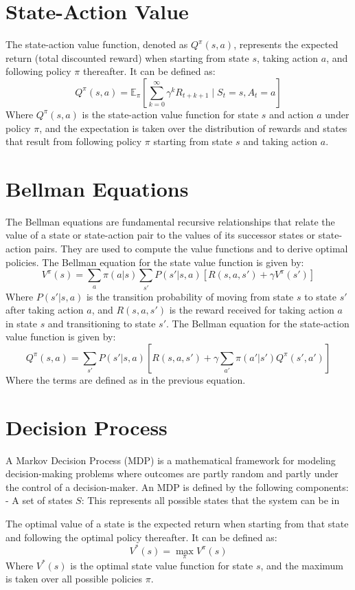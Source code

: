 \documentclass[conference]{IEEEtran}
\begin{document}
\section*{State-Action Value}
The state-action value function, denoted as $Q^{\pi}(s,a)$, represents the expected return (total discounted reward) when starting from state $s$, taking action $a$, and following policy $\pi$ thereafter. It can be defined as:
$$ Q^{\pi}(s,a) = \mathbb{E}_{\pi} \left[ \sum_{k=0}^{\infty} \gamma^k R_{t+k+1} \mid S_t = s, A_t = a \right] $$
Where $Q^{\pi}(s,a)$ is the state-action value function for state $s$ and action $a$ under policy $\pi$, and the expectation is taken over the distribution of rewards and states that result from following policy $\pi$ starting from state $s$ and taking action $a$.

\section*{Bellman Equations}
The Bellman equations are fundamental recursive relationships that relate the value of a state or state-action pair
to the values of its successor states or state-action pairs. They are used to compute the value functions and to derive optimal policies.
The Bellman equation for the state value function is given by:
$$ V^{\pi}(s) = \sum_{a} \pi(a|s) \sum_{s'} P(s'|s,a) \left[ R(s,a,s') + \gamma V^{\pi}(s') \right] $$
Where $P(s'|s,a)$ is the transition probability of moving from state $s$ to state $s'$ after taking action $a$, and $R(s,a,s')$ is the reward received for taking action $a$ in state $s$ and transitioning to state $s'$.
The Bellman equation for the state-action value function is given by:
$$ Q^{\pi}(s,a) = \sum_{s'} P(s'|s,a) \left[ R(s,a,s') + \gamma \sum_{a'} \pi(a'|s') Q^{\pi}(s',a') \right] $$
Where the terms are defined as in the previous equation.


\section*{Decision Process}
A Markov Decision Process (MDP) is a mathematical framework for modeling decision-making problems where outcomes are partly random and partly under the control of a decision-maker. An MDP is defined by the following components:
- A set of states $S$: This represents all possible states that the system can be in

The optimal value of a state is the expected return when starting from that state and following the optimal policy thereafter. It can be defined as:
$$ V^*(s) = \max_{\pi} V^{\pi}(s) $$
Where $V^*(s)$ is the optimal state value function for state $s$, and the maximum is taken over all possible policies $\pi$.        
\end{document}
